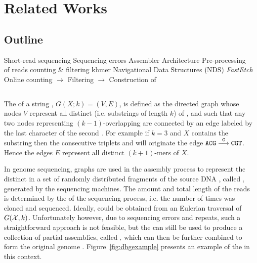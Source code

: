 \chapter{Related Works}

\section{Outline}

\begin{outline}
    \1 Short-read sequencing
        \2 Sequencing errors
    \1 Assembler Architecture
        \2 \dBG
        \2 Pre-processing of reads
            \3 \kmer counting \& filtering
                \4 khmer\cite{Zhang2014}
    \1 Navigational Data Structures (NDS)
        \2 \cite{Chikhi2014}
    \1 \emph{FastEtch} \cite{Ghosh2019}
        \2 Online counting $\rightarrow$ Filtering $\rightarrow$ Construction of \dBG
\end{outline}

\section{}
\label{sec:dBG}


The  of a string , $G(X;k)=(V,E)$, is defined as the directed graph whose nodes $V$ represent all distinct  (i.e. substrings of length $k$) of , and such that any two nodes representing $(k-1)$-overlapping  are connected by an edge labeled by the last character of the second \kmer. For example if $k=3$ and $X$ contains the substring  then the consecutive triplets  and  will originate the edge $\mathtt{ACG}\stackrel{\mathtt{C}}{\longrightarrow}\mathtt{CGT}$. Hence the edges $E$ represent all distinct $(k+1)$-mers of $X$. 

In genome sequencing, \dB graphs are used in the assembly process to represent the distinct  in a set \readset of randomly distributed fragments of the source DNA , called , generated by the sequencing machines. The amount and total length of the reads is determined by the  of the sequencing process, i.e. the number of times  was cloned and sequenced. Ideally,  could be obtained from an Eulerian traversal of $G(\readset, k)$. Unfortunately however, due to sequencing errors and repeats, such a straightforward approach is not feasible, but the \dBG can still be used to produce a collection of partial assemblies, called , which can then be further combined to form the original genome \cite{Pevzner2001}. Figure~\ref{fig:dbgexample} presents an example of the \dBG in this context.

